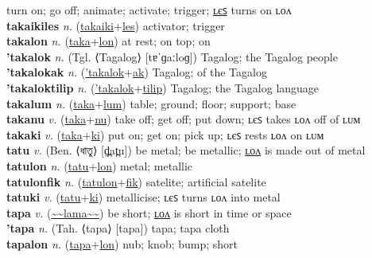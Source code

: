 turn on; go off; animate; activate; trigger; \hyperref[takaikiles]{ʟєꜱ} turns on ʟᴏᴧ \label{takaiki} \\
\textbf{takaikiles} \textit{n.} (\hyperref[takaiki]{takaiki}+\hyperref[les]{les})
activator; trigger \label{takaikiles} \\
\textbf{takalon} \textit{n.} (\hyperref[taka]{taka}+\hyperref[lon]{lon})
at rest; on top; on \label{takalon} \\
\textbf{'takalok} \textit{n.} (Tgl. ⟨Tagalog⟩ [tɐˈɡaːloɡ])
Tagalog; the Tagalog people \label{'takalok} \\
\textbf{'takalokak} \textit{n.} (\hyperref['takalok]{'takalok}+\hyperref[ak]{ak})
Tagalog; of the Tagalog \label{'takalokak} \\
\textbf{'takaloktilip} \textit{n.} (\hyperref['takalok]{'takalok}+\hyperref[tilip]{tilip})
Tagalog; the Tagalog language \label{'takaloktilip} \\
\textbf{takalum} \textit{n.} (\hyperref[taka]{taka}+\hyperref[lum]{lum})
table; ground; floor; support; base \label{takalum} \\
\textbf{takanu} \textit{v.} (\hyperref[taka]{taka}+\hyperref[nu]{nu})
take off; get off; put down; ʟєꜱ takes ʟᴏᴧ off of ʟᴜᴍ \label{takanu} \\
\textbf{takaki} \textit{v.} (\hyperref[taka]{taka}+\hyperref[ki]{ki})
put on; get on; pick up; ʟєꜱ rests ʟᴏᴧ on ʟᴜᴍ \label{takaki} \\
\textbf{tatu} \textit{v.} (Ben. ⟨ধাতু⟩ [d̪̤at̪u])
be metal; be metallic; \hyperref[tatulon]{ʟᴏᴧ} is made out of metal \label{tatu} \\
\textbf{tatulon} \textit{n.} (\hyperref[tatu]{tatu}+\hyperref[lon]{lon})
metal; metallic \label{tatulon} \\
\textbf{tatulonfik} \textit{n.} (\hyperref[tatulon]{tatulon}+\hyperref[fik]{fik})
satelite; artificial satelite \label{tatulonfik} \\
\textbf{tatuki} \textit{v.} (\hyperref[tatu]{tatu}+\hyperref[ki]{ki})
metallicise; ʟєꜱ turns ʟᴏᴧ into metal \label{tatuki} \\
\textbf{tapa} \textit{v.} (\hyperref[lama]{\~{}\~{}lama\~{}\~{}})
be short; \hyperref[tapalon]{ʟᴏᴧ} is short in time or space \label{tapa} \\
\textbf{'tapa} \textit{n.} (Tah. ⟨tapa⟩ [tapa])
tapa; tapa cloth \label{'tapa} \\
\textbf{tapalon} \textit{n.} (\hyperref[tapa]{tapa}+\hyperref[lon]{lon})
nub; knob; bump; short \label{tapalon} \\
